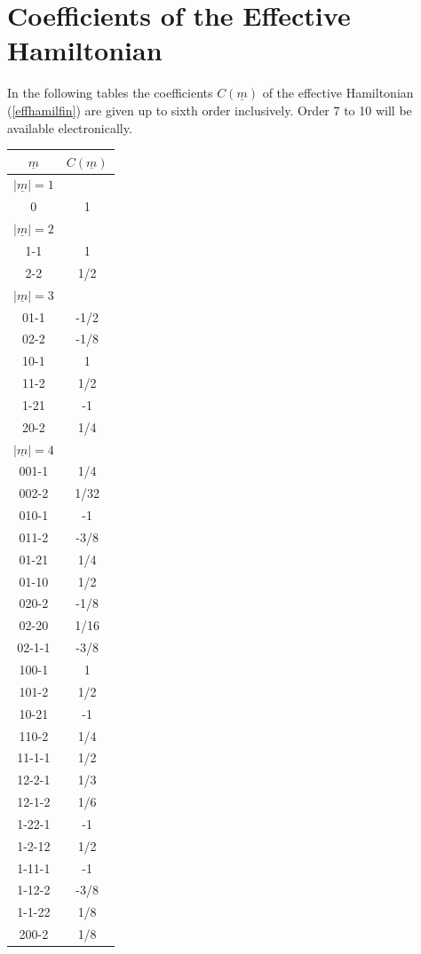 \section{Coefficients of the Effective Hamiltonian}
\label{app-coeff}
In the following tables the coefficients $C(\underline{m})$ of the 
effective Hamiltonian (\ref{effhamilfin}) are given up to sixth
order inclusively. Order 7 to 10 will be available electronically.\\[2mm]
\begin{tabular}[t]{|cc|}
\hline
$\underline{m}$ & $C(\underline{m})$\\
\hline\hline
$|\underline{m}|=1$&\\
\hline
0 &  1\\
\hline
$|\underline{m}|=2$&\\
\hline
1-1 &  1\\
2-2 &  1/2\\
\hline 
$|\underline{m}|=3$&\\
\hline
01-1 &  -1/2\\
02-2 &  -1/8\\
10-1 &  1\\
11-2 &  1/2\\
1-21 &  -1\\
20-2 &  1/4\\
\hline
$|\underline{m}|=4$&\\
\hline
001-1 & 1/4\\
002-2 & 1/32\\
010-1 & -1\\
011-2 & -3/8\\
01-21 & 1/4\\
01-10 & 1/2\\
020-2 & -1/8\\
02-20 & 1/16\\
02-1-1 & -3/8\\
100-1 & 1\\
101-2 & 1/2\\
10-21 & -1\\
110-2 & 1/4\\
11-1-1 & 1/2\\
12-2-1 & 1/3\\
12-1-2 & 1/6\\
1-22-1 & -1\\
1-2-12 & 1/2\\
1-11-1 & -1\\
1-12-2 & -3/8\\
1-1-22 & 1/8\\
200-2 & 1/8\\

\end{tabular}
